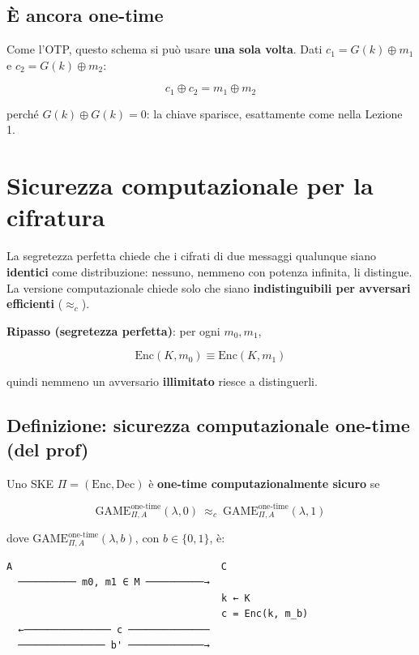 \subsection{È ancora one-time}

Come l'OTP, questo schema si può usare \textbf{una sola volta}. Dati \(c_1 = G(k) \oplus m_1\) e \(c_2 = G(k) \oplus m_2\):

\[
c_1 \oplus c_2 = m_1 \oplus m_2
\]

perché \(G(k) \oplus G(k) = 0\): la chiave sparisce, esattamente come nella Lezione 1.

\section{Sicurezza computazionale per la cifratura}

\begin{inbreve}

La segretezza perfetta chiede che i cifrati di due messaggi qualunque siano \textbf{identici} come distribuzione: nessuno, nemmeno con potenza infinita, li distingue. La versione computazionale chiede solo che siano \textbf{indistinguibili per avversari efficienti} (\(\approx_c\)).

\end{inbreve}

\textbf{Ripasso (segretezza perfetta)}: per ogni \(m_0, m_1\),

\[
\text{Enc}(K, m_0) \equiv \text{Enc}(K, m_1)
\]

quindi nemmeno un avversario \textbf{illimitato} riesce a distinguerli.

\subsection{Definizione: sicurezza computazionale one-time (del prof)}

Uno SKE \(\Pi = (\text{Enc}, \text{Dec})\) è \textbf{one-time computazionalmente sicuro} se

\[
\text{GAME}^{\text{one-time}}_{\Pi, A}(\lambda, 0) \ \approx_c\ \text{GAME}^{\text{one-time}}_{\Pi, A}(\lambda, 1)
\]

dove \(\text{GAME}^{\text{one-time}}_{\Pi, A}(\lambda, b)\), con \(b \in \{0, 1\}\), è:

\begin{verbatim}
A                                    C
  ────────── m0, m1 ∈ M ──────────→
                                     k ← K
                                     c = Enc(k, m_b)
  ←─────────────── c ──────────────
  ─────────────── b' ─────────────→
\end{verbatim}

